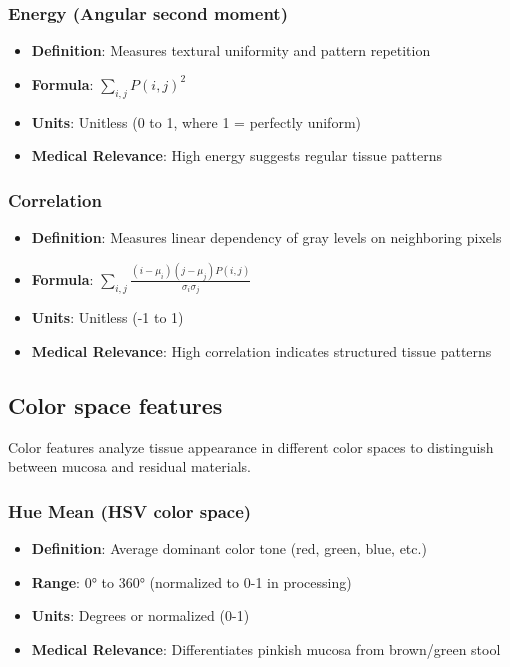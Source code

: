 \documentclass[11pt]{article}
\begin{document}
\subsubsection{Energy (Angular second moment)}
\begin{itemize}
    \item \textbf{Definition}: Measures textural uniformity and pattern repetition
    \item \textbf{Formula}: $\displaystyle \sum_{i,j} P(i,j)^2$
    \item \textbf{Units}: Unitless (0 to 1, where 1 = perfectly uniform)
    \item \textbf{Medical Relevance}: High energy suggests regular tissue patterns
\end{itemize}

\subsubsection{Correlation}
\begin{itemize}
    \item \textbf{Definition}: Measures linear dependency of gray levels on neighboring pixels
    \item \textbf{Formula}: $\displaystyle \sum_{i,j} \frac{(i-\mu_i)(j-\mu_j)P(i,j)}{\sigma_i\sigma_j}$
    \item \textbf{Units}: Unitless (-1 to 1)
    \item \textbf{Medical Relevance}: High correlation indicates structured tissue patterns
\end{itemize}

\subsection{Color space features}

Color features analyze tissue appearance in different color spaces to distinguish between mucosa and residual materials.

\subsubsection{Hue Mean (HSV color space)}
\begin{itemize}
    \item \textbf{Definition}: Average dominant color tone (red, green, blue, etc.)
    \item \textbf{Range}: 0° to 360° (normalized to 0-1 in processing)
    \item \textbf{Units}: Degrees or normalized (0-1)
    \item \textbf{Medical Relevance}: Differentiates pinkish mucosa from brown/green stool
\end{itemize}
\end{document}
